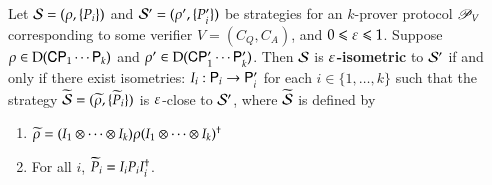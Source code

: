 \begin{definition}
	Let $\mathcal{S} = (\rho,\{P_i\})$ and $\mathcal{S}' = (\rho',\{P_i'\})$ be strategies for an $k$-prover protocol $\mathscr{P}_V$ corresponding to some verifier $V = (C_Q,C_A)$, and $0\leqslant \varepsilon\leqslant 1$. Suppose $\rho \in \mathrm{D}({\mathsf{C}} {\mathsf{P}}_1 \cdots {\mathsf{P}}_k)$ and $\rho' \in \mathrm{D}({\mathsf{C}} {\mathsf{P}}_1' \cdots {\mathsf{P}}_k')$. Then $\mathcal{S}$ is \textbf{$\varepsilon$-isometric} to $\mathcal{S}'$ if and only if there exist isometries: $I_i : {\mathsf{P}}_i \to {\mathsf{P}}_i'$ for each $i\in\{1,\ldots,k\}$ such that the strategy $\widetilde{\mathcal{S}} = (\widetilde{\rho}, \{ \widetilde{P}_i \})$ is $\varepsilon$-close to $\mathcal{S}'$, where $\widetilde{\mathcal{S}}$ is defined by
	\begin{enumerate}
		\item $\widetilde{\rho} = (I_1 \otimes \cdots \otimes I_k) \rho (I_1 \otimes \cdots \otimes I_k)^\dagger$
		\item For all $i$, $\widetilde{P}_i = I_i P_i I_i^\dagger$.
	\end{enumerate}
\end{definition}


